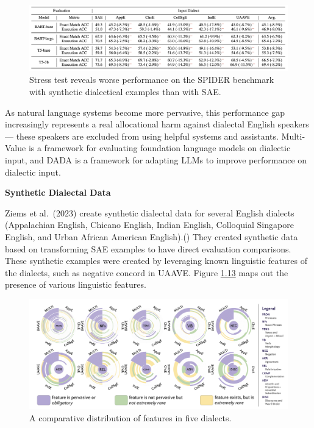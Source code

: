 \documentclass[
  letterpaper,
  DIV=11,
  numbers=noendperiod,
  oneside]{scrreprt}
\theoremstyle{remark}
\begin{document}
\begin{figure}[H]

{\centering \includegraphics[width=1\textwidth,height=\textheight]{Figures/MV2.png}

}

\caption{Stress test reveals worse performance on the SPIDER benchmark
with synthetic dialectical examples than with SAE.}

\end{figure}%

As natural language systems become more pervasive, this performance gap
increasingly represents a real allocational harm against dialectal
English speakers --- these speakers are excluded from using helpful
systems and assistants. Multi-Value is a framework for evaluating
foundation language models on dialectic input, and DADA is a framework
for adapting LLMs to improve performance on dialectic input.

\textbf{Synthetic Dialectal Data}

Ziems et al.~(2023) create synthetic dialectal data for several English
dialects (Appalachian English, Chicano English, Indian English,
Colloquial Singapore English, and Urban African American
English).() They created synthetic
data based on transforming SAE examples to have direct evaluation
comparisons. These synthetic examples were created by leveraging known
linguistic features of the dialects, such as negative concord in UAAVE.
Figure \hyperref[fig:features_dialects]{1.13} maps out the presence of
various linguistic features.

\begin{figure}

{\centering \includegraphics[width=1\textwidth,height=\textheight]{Figures/MV1.png}

}

\caption{A comparative distribution of features in five dialects.}

\end{figure}%
\end{document}

